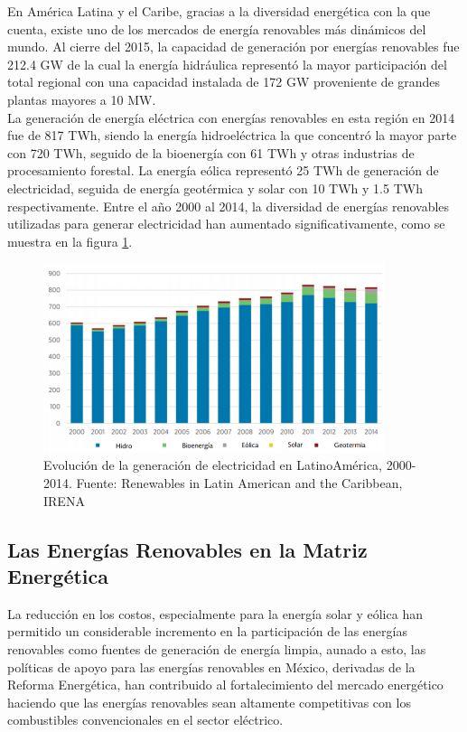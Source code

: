 En América Latina y el Caribe, gracias a la diversidad energética con la que cuenta, existe uno de los mercados de energía renovables más dinámicos del mundo. Al cierre del 2015, la capacidad de generación por energías renovables fue 212.4 GW de la cual la energía hidráulica representó la mayor participación del total regional con una capacidad instalada de 172 GW proveniente de grandes plantas mayores a 10 MW.\\

La generación de energía eléctrica con energías renovables en esta región en 2014 fue de 817 TWh, siendo la energía hidroeléctrica la que concentró la mayor parte con 720 TWh, seguido de la bioenergía con 61 TWh y otras industrias de procesamiento forestal. La energía eólica representó 25 TWh de generación de electricidad, seguida de energía geotérmica y solar con 10 TWh y 1.5 TWh respectivamente. Entre el año 2000 al 2014, la diversidad de energías renovables utilizadas para generar electricidad han aumentado significativamente, como se muestra en la figura \ref{2000}. 

\begin{figure}[!h]
	\centering
	\includegraphics[width=10cm]{img/produccion.png}
	\caption{Evolución de la generación de electricidad en LatinoAmérica, 2000-2014. Fuente: Renewables in Latin American and the Caribbean, IRENA}
	\label{2000}
\end{figure}

\subsection{Las Energías Renovables en la Matriz Energética}

La reducción en los costos, especialmente para la energía solar y eólica han permitido un considerable incremento en la participación de las energías renovables como fuentes de generación de energía limpia, aunado a esto, las políticas de apoyo para las energías renovables en México, derivadas de la Reforma Energética, han contribuido al fortalecimiento del mercado energético haciendo que las energías renovables sean altamente competitivas con los combustibles convencionales en el sector eléctrico.

